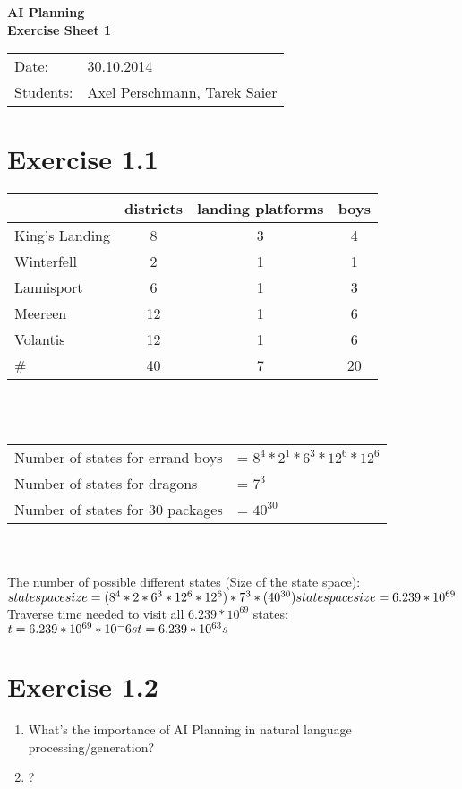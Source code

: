 \documentclass[11pt,a4paper]{article}
\begin{document}
\begin{center}
\Huge{\textbf{AI Planning}}\\
\LARGE{\textbf{Exercise Sheet 1}}
\end{center}
\vspace{2cm}
\begin{tabular}{ll}
Date: & 30.10.2014\\
Students: & Axel Perschmann, Tarek Saier
\end{tabular}

\section*{Exercise 1.1}
\begin{tabular}{ l | c c c }
     & districts & landing platforms & boys \\
  \hline
  King's Landing &  8 & 3 & 4\\
  Winterfell &  2 & 1 & 1\\
  Lannisport &  6 & 1 & 3\\
  Meereen & 12 & 1 & 6\\
  Volantis & 12 & 1 & 6\\
  \hline
  \#  & 40 & 7 & 20
\end{tabular}\\\\

\begin{tabular}{ll}
Number of states for errand boys & = $8^4 * 2^1 * 6^3 * 12^6 * 12^6$ \\
Number of states for dragons & = $7^3$ \\
Number of states for 30 packages &= $40^{30}$
\end{tabular}\\\\

The number of possible different states (Size of the state space):\\
$state space size = (8^4 * 2 * 6^3 * 12^6 * 12^6)  *  7^3  * (40^{30})\\
state space size= 6.239 * 10^{69}$\\

Traverse time needed to visit all $6.239 * 10^{69}$ states:\\
$t = 6.239 * 10^{69} * 10^-6s\\
t = 6.239 * 10^{63}s$

\section*{Exercise 1.2}

\begin{enumerate}
\item
What's the importance of AI Planning in natural language processing/generation?
\item
?
\end{enumerate}
\end{document}
